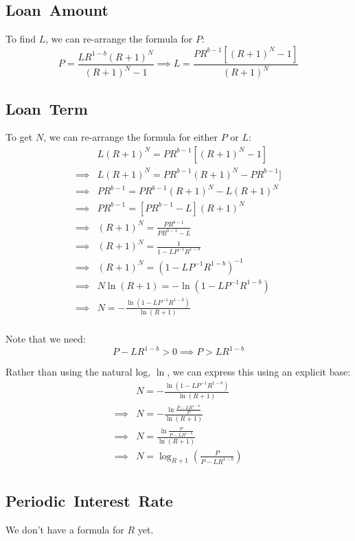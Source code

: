 \subsection{Loan~Amount}\label{subsec:frl-loan-amount}
To find \(L\), we can re-arrange the formula for \(P\):
\begin{equation*}
    P = \frac{LR^{1 - b}(R + 1)^{N}}{(R + 1)^{N} - 1}
    \implies
    L = \frac{PR^{b - 1}\left[(R + 1)^{N} - 1\right]}{(R + 1)^{N}}
\end{equation*}


\subsection{Loan~Term}\label{subsec:frl-loan-term}
To get \(N\), we can re-arrange the formula for either \(P\) or \(L\):
\begin{equation*}
    \begin{split}
        & L(R + 1)^{N} = PR^{b - 1}\left[(R + 1)^{N} - 1\right]\\
        \implies & L(R + 1)^{N} = PR^{b - 1}(R + 1)^{N} - PR^{b - 1}]\\
        \implies & PR^{b - 1} = PR^{b - 1}(R + 1)^{N} - L(R + 1)^{N}\\
        \implies & PR^{b - 1} = \left[PR^{b - 1} - L\right](R + 1)^{N}\\
        \implies & (R + 1)^{N} = \frac{PR^{b - 1}}{PR^{b - 1} - L}\\
        \implies & (R + 1)^{N} = \frac{1}{1 - LP^{-1}R^{1 - b}}\\
        \implies & (R + 1)^{N} = (1 - LP^{-1}R^{1 - b})^{-1}\\
        \implies & N \ln{(R + 1)} = -\ln{(1 - LP^{-1}R^{1 - b})}\\
        \implies & N = -\frac{\ln{(1 - LP^{-1}R^{1 - b})}}{\ln{(R + 1)}}\\
    \end{split}
\end{equation*}

Note that we need:
\begin{equation*}
    P - LR^{1 - b} > 0 \implies P > LR^{1 - b}
\end{equation*}

Rather than using the natural log, \(\ln\), we can express this using an explicit base:
\begin{equation*}
    \begin{split}
        & N = -\frac{\ln{(1 - LP^{-1}R^{1 - b})}}{\ln{(R + 1)}}\\
        \implies & N = -\frac{\ln{ \frac{P - LR^{1 - b}}{P} }}{\ln{(R + 1)}}\\
        \implies & N = \frac{\ln{ \frac{P}{P - LR^{1 - b}} }}{\ln{(R + 1)}}\\
        \implies & N = \log_{R + 1} \left(\frac{P}{P - LR^{1 - b}}\right)\\
    \end{split}
\end{equation*}


\subsection{Periodic~Interest~Rate}\label{subsec:frl-periodic-interest-rate}
We don't have a formula for \(R\) yet.
